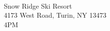 \documentclass[12pt]{article}
\begin{document}
\begin{minipage}[t]{0.495\textwidth}
\ 

    {\Large {}}

\vspace*{.1in}

{\Large  Snow Ridge Ski Resort \\ 4173 West Road, Turin, NY 13473 \\ \vspace{0.2cm }4PM}
\vspace*{.1in}
\end{minipage}
\end{document}
